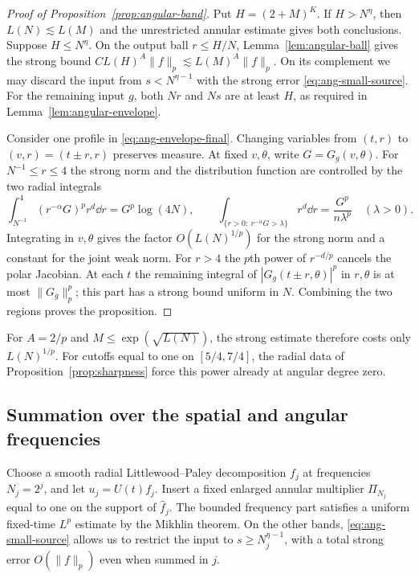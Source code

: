 \begin{proof}[Proof of Proposition~\ref{prop:angular-band}]
Put $H=(2+M)^K$. If $H>N^\eta$, then $L(N)\lesssim L(M)$ and the
unrestricted annular estimate gives both conclusions. Suppose $H\le N^\eta$.
On the output ball $r\le H/N$, Lemma~\ref{lem:angular-ball} gives
the strong bound $CL(H)^A\|f\|_p\lesssim L(M)^A\|f\|_p$.
On its complement we may discard the input from $s<N^{\eta-1}$ with
the strong error \eqref{eq:ang-small-source}. For the remaining input
$g$, both $Nr$ and $Ns$ are at least $H$, as required in
Lemma~\ref{lem:angular-envelope}.

Consider one profile in \eqref{eq:ang-envelope-final}. Changing variables
from $(t,r)$ to $(v,r)=(t\pm r,r)$ preserves measure. At fixed $v,\theta$,
write $G=G_g(v,\theta)$. For $N^{-1}\le r\le4$ the strong norm and the
distribution function are controlled by the two radial integrals
\begin{equation}\label{eq:ang-radial-integrals}
 \int_{N^{-1}}^4(r^{-\alpha}G)^p r^d\dd r=G^p\log(4N),\qquad
 \int_{\{r>0:\ r^{-\alpha}G>\lambda\}}r^d\dd r
       =\frac{G^p}{n\lambda^p}\quad(\lambda>0).
\end{equation}
Integrating in $v,\theta$ gives the factor $O(L(N)^{1/p})$ for the
strong norm and a constant for the joint weak norm. For $r>4$ the
$p$th power of $r^{-d/p}$ cancels the polar Jacobian. At each $t$ the
remaining integral of $|G_g(t\pm r,\theta)|^p$ in $r,\theta$ is at
most $\|G_g\|_p^p$; this part has a strong bound uniform in $N$.
Combining the two regions proves the proposition.
\end{proof}

For $A=2/p$ and $M\le\exp(\sqrt{L(N)})$, the strong estimate therefore
costs only $L(N)^{1/p}$. For cutoffs equal to one on $[5/4,7/4]$, the
radial data of Proposition~\ref{prop:sharpness} force this power already
at angular degree zero.

\subsection{Summation over the spatial and angular frequencies}

Choose a smooth radial Littlewood--Paley decomposition $f_j$ at frequencies
$N_j=2^j$, and let $u_j=U(t)f_j$. Insert a fixed enlarged annular multiplier
$\Pi_{N_j}$ equal to one on the support of $\widehat f_j$. The bounded
frequency part satisfies a uniform fixed-time $L^p$ estimate by the
Mikhlin theorem. On the other bands, \eqref{eq:ang-small-source} allows
us to restrict the input to $s\ge N_j^{\eta-1}$, with a total strong
error $O(\|f\|_p)$ even when summed in $j$.

